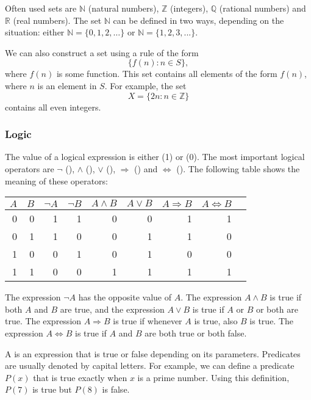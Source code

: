 Often used sets are
$\mathbb{N}$ (natural numbers),
$\mathbb{Z}$ (integers),
$\mathbb{Q}$ (rational numbers) and
$\mathbb{R}$ (real numbers).
The set $\mathbb{N}$
can be defined in two ways, depending
on the situation:
either $\mathbb{N}=\{0,1,2,\ldots\}$
or $\mathbb{N}=\{1,2,3,...\}$.

We can also construct a set using a rule of the form
\[\{f(n) : n \in S\},\]
where $f(n)$ is some function.
This set contains all elements of the form $f(n)$,
where $n$ is an element in $S$.
For example, the set
\[X=\{2n : n \in \mathbb{Z}\}\]
contains all even integers.

\subsubsection{Logic}


The value of a logical expression is either
 (1) or  (0).
The most important logical operators are
$\lnot$ (),
$\land$ (),
$\lor$ (),
$\Rightarrow$ () and
$\Leftrightarrow$ ().
The following table shows the meaning of these operators:

\begin{center}
\begin{tabular}{rr|rrrrrrr}
$A$ & $B$ & $\lnot A$ & $\lnot B$ & $A \land B$ & $A \lor B$ & $A \Rightarrow B$ & $A \Leftrightarrow B$ \\
\hline
0 & 0 & 1 & 1 & 0 & 0 & 1 & 1 \\
0 & 1 & 1 & 0 & 0 & 1 & 1 & 0 \\
1 & 0 & 0 & 1 & 0 & 1 & 0 & 0 \\
1 & 1 & 0 & 0 & 1 & 1 & 1 & 1 \\
\end{tabular}
\end{center}

The expression $\lnot A$ has the opposite value of $A$.
The expression $A \land B$ is true if both $A$ and $B$
are true,
and the expression $A \lor B$ is true if $A$ or $B$ or both
are true.
The expression $A \Rightarrow B$ is true
if whenever $A$ is true, also $B$ is true.
The expression $A \Leftrightarrow B$ is true
if $A$ and $B$ are both true or both false.


A  is an expression that is true or false
depending on its parameters.
Predicates are usually denoted by capital letters.
For example, we can define a predicate $P(x)$
that is true exactly when $x$ is a prime number.
Using this definition, $P(7)$ is true but $P(8)$ is false.

